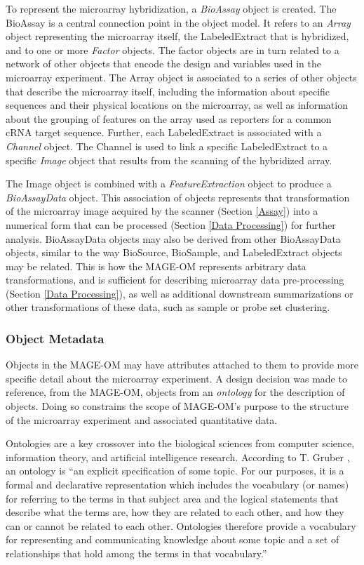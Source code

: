 To represent the microarray hybridization, a \emph{BioAssay} object is created.
The BioAssay is a central connection point in the object model.  It refers to
an \emph{Array} object representing the microarray itself, the LabeledExtract
that is hybridized, and to one or more \emph{Factor} objects.  The factor
objects are in turn related to a network of other objects that encode the
design and variables used in the microarray experiment.  The Array object is
associated to a series of other objects that describe the microarray itself,
including the information about specific sequences and their physical locations
on the microarray, as well as information about the grouping of features on the
array used as reporters for a common cRNA target sequence.  Further, each
LabeledExtract is associated with a \emph{Channel} object.  The Channel is used
to link a specific LabeledExtract to a specific \emph{Image} object that
results from the scanning of the hybridized array.

The Image object is combined with a \emph{FeatureExtraction} object to produce
a \emph{BioAssayData} object.  This association of objects represents that
transformation of the microarray image acquired by the scanner (Section
\ref{Assay}) into a numerical form that can be processed (Section \ref{Data
Processing}) for further analysis.  BioAssayData objects may also be derived
from other BioAssayData objects, similar to the way BioSource, BioSample, and
LabeledExtract objects may be related.  This is how the MAGE-OM represents
arbitrary data transformations, and is sufficient for describing microarray
data pre-processing (Section \ref{Data Processing}), as well as additional
downstream summarizations or other transformations of these data, such as
sample or probe set clustering.

\subsubsection{Object Metadata}
\label{Object Metadata}

Objects in the MAGE-OM may have attributes attached to them to provide
more specific detail about the microarray experiment.  A design decision was
made to reference, from the MAGE-OM, objects from an \emph{ontology} for the
description of objects.  Doing so constrains the scope of MAGE-OM's purpose to
the structure of the microarray experiment and associated quantitative data.

Ontologies are a key crossover into the biological sciences from computer
science, information theory, and artificial intelligence research.  According
to T. Gruber \cite{XXX}, an ontology is ``an explicit specification of some
topic. For our purposes, it is a formal and declarative representation which
includes the vocabulary (or names) for referring to the terms in that subject
area and the logical statements that describe what the terms are, how they are
related to each other, and how they can or cannot be related to each other.
Ontologies therefore provide a vocabulary for representing and communicating
knowledge about some topic and a set of relationships that hold among the terms
in that vocabulary.''

